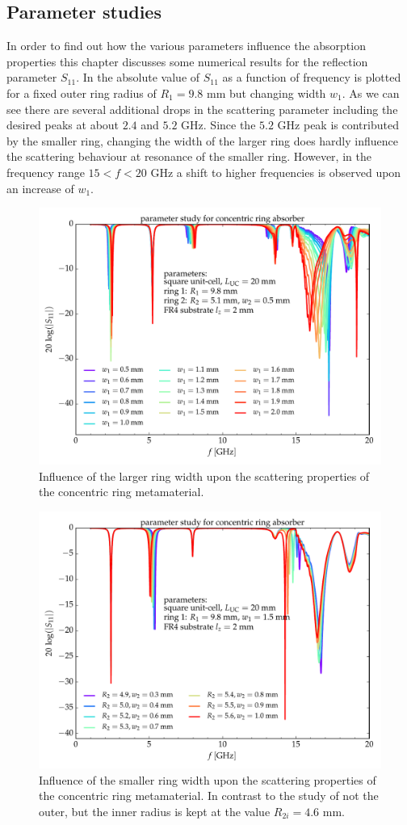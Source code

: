 \subsection{Parameter studies}
In order to find out how the various parameters influence the absorption properties this chapter discusses some numerical results for the reflection parameter $S_{11}$.
In  the absolute value of $S_{11}$ as a function of frequency is plotted for a fixed outer ring radius of $R_1=9.8$ mm but changing width $w_1$. As we can see there are several additional drops in the scattering parameter including the desired peaks at about $2.4$ and $5.2$ GHz. Since the $5.2$ GHz peak is contributed by the smaller ring, changing the width of the larger ring does hardly influence the scattering behaviour at resonance of the smaller ring. However, in the frequency range $15<f<20$ GHz a shift to higher frequencies is observed upon an increase of $w_1$.

\begin{figure}
\centering
\includegraphics[width=0.75\linewidth]{./media/dual-wifi_absorber_w1.pdf}
\caption{Influence of the larger ring width upon the scattering properties of the concentric ring metamaterial.}
\label{fig:w1_sweep}
\end{figure}

\begin{figure}
\centering
\includegraphics[width=0.75\linewidth]{./media/dual-wifi_absorber_w2.pdf}
\caption{Influence of the smaller ring width upon the scattering properties of the concentric ring metamaterial. In contrast to the study of  not the outer, but the inner radius is kept at the value $R_{2i}=4.6$ mm.}
\label{fig:w2_sweep}
\end{figure}


